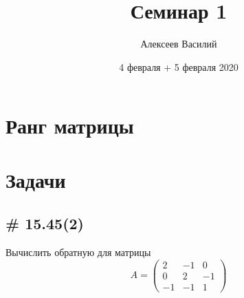 \documentclass[a4paper,12pt]{article}
\author{Алексеев Василий}
\title{Семинар 1}
\date{4 февраля + 5 февраля 2020}
\begin{document}
  \maketitle
  
  \tableofcontents

  \thispagestyle{empty}
  
  \newpage
  


  \section{Ранг матрицы}
  
  
  \section{Задачи}
  
  
  \subsection{\# 15.45(2)}
  
  Вычислить обратную для матрицы
  \[
    A = \begin{pmatrix}
      2 & -1 & 0\\
      0 & 2 & -1\\
      -1 & -1 & 1
    \end{pmatrix}
  \]
  
\end{document}

